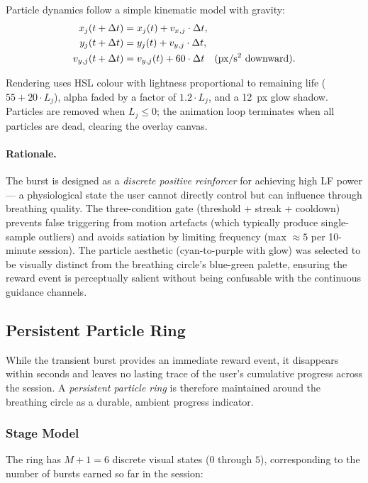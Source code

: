 \documentclass[11pt,a4paper]{article}
\begin{document}
Particle dynamics follow a simple kinematic model with gravity:
\begin{align*}
  x_j(t+\Delta t) &= x_j(t) + v_{x,j} \cdot \Delta t, \\
  y_j(t+\Delta t) &= y_j(t) + v_{y,j} \cdot \Delta t, \\
  v_{y,j}(t+\Delta t) &= v_{y,j}(t) + 60 \cdot \Delta t \quad\text{(px/s\textsuperscript{2} downward)}.
\end{align*}

Rendering uses HSL colour with lightness proportional to remaining life
($55 + 20 \cdot L_j$), alpha faded by a factor of $1.2 \cdot L_j$, and a
12~px glow shadow. Particles are removed when $L_j \leq 0$; the animation
loop terminates when all particles are dead, clearing the overlay canvas.

\paragraph{Rationale.}
The burst is designed as a \textit{discrete positive reinforcer} for
achieving high LF power — a physiological state the user cannot directly
control but can influence through breathing quality. The three-condition
gate (threshold + streak + cooldown) prevents false triggering from
motion artefacts (which typically produce single-sample outliers) and
avoids satiation by limiting frequency (max $\approx 5$ per 10-minute
session). The particle aesthetic (cyan-to-purple with glow) was selected
to be visually distinct from the breathing circle's blue-green palette,
ensuring the reward event is perceptually salient without being
confusable with the continuous guidance channels.

\subsection{Persistent Particle Ring}

While the transient burst provides an immediate reward event, it
disappears within seconds and leaves no lasting trace of the user's
cumulative progress across the session. A \textit{persistent particle
ring} is therefore maintained around the breathing circle as a durable,
ambient progress indicator.

\subsubsection{Stage Model}

The ring has $M + 1 = 6$ discrete visual states ($0$ through $5$),
corresponding to the number of bursts earned so far in the session:
\end{document}
